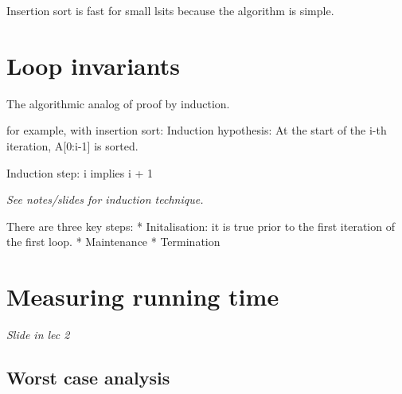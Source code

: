 Insertion sort is fast for small lsits because the algorithm is simple.

\hypertarget{loop-invariants}{%
\section{Loop invariants}\label{loop-invariants}}

The algorithmic analog of proof by induction.

for example, with insertion sort: Induction hypothesis: At the start of
the i-th iteration, A{[}0:i-1{]} is sorted.

Induction step: i implies i + 1

\emph{See notes/slides for induction technique.}

There are three key steps: * Initalisation: it is true prior to the
first iteration of the first loop. * Maintenance * Termination

\hypertarget{measuring-running-time}{%
\section{Measuring running time}\label{measuring-running-time}}

\emph{Slide in lec 2}

\hypertarget{worst-case-analysis}{%
\subsection{Worst case analysis}\label{worst-case-analysis}}
